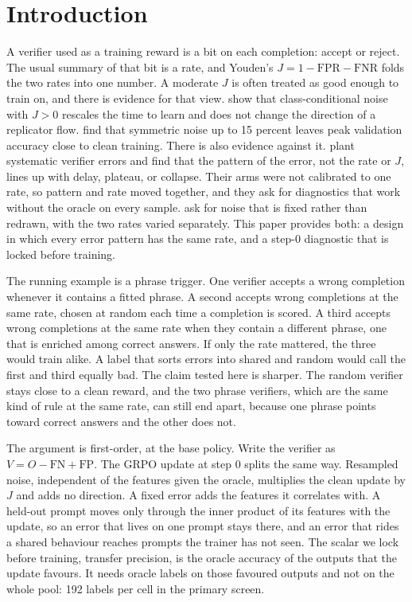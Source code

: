 \section{Introduction}
\label{sec:intro}

A verifier used as a training reward is a bit on each completion: accept or reject.
The usual summary of that bit is a rate, and Youden's $J = 1 - \mathrm{FPR} - \mathrm{FNR}$ folds the two rates into one number.
A moderate $J$ is often treated as good enough to train on, and there is evidence for that view.
\citet{rad2026rate} show that class-conditional noise with $J > 0$ rescales the time to learn and does not change the direction of a replicator flow.
\citet{plesner2026noise} find that symmetric noise up to 15 percent leaves peak validation accuracy close to clean training.
There is also evidence against it.
\citet{egashira2026delay} plant systematic verifier errors and find that the pattern of the error, not the rate or $J$, lines up with delay, plateau, or collapse.
Their arms were not calibrated to one rate, so pattern and rate moved together, and they ask for diagnostics that work without the oracle on every sample.
\citet{plesner2026noise} ask for noise that is fixed rather than redrawn, with the two rates varied separately.
This paper provides both: a design in which every error pattern has the same rate, and a step-0 diagnostic that is locked before training.

The running example is a phrase trigger.
One verifier accepts a wrong completion whenever it contains a fitted phrase.
A second accepts wrong completions at the same rate, chosen at random each time a completion is scored.
A third accepts wrong completions at the same rate when they contain a different phrase, one that is enriched among correct answers.
If only the rate mattered, the three would train alike.
A label that sorts errors into shared and random would call the first and third equally bad.
The claim tested here is sharper.
The random verifier stays close to a clean reward, and the two phrase verifiers, which are the same kind of rule at the same rate, can still end apart, because one phrase points toward correct answers and the other does not.

The argument is first-order, at the base policy.
Write the verifier as $V = O - \mathrm{FN} + \mathrm{FP}$.
The GRPO update at step 0 splits the same way.
Resampled noise, independent of the features given the oracle, multiplies the clean update by $J$ and adds no direction.
A fixed error adds the features it correlates with.
A held-out prompt moves only through the inner product of its features with the update, so an error that lives on one prompt stays there, and an error that rides a shared behaviour reaches prompts the trainer has not seen.
The scalar we lock before training, transfer precision, is the oracle accuracy of the outputs that the update favours.
It needs oracle labels on those favoured outputs and not on the whole pool: 192 labels per cell in the primary screen.

